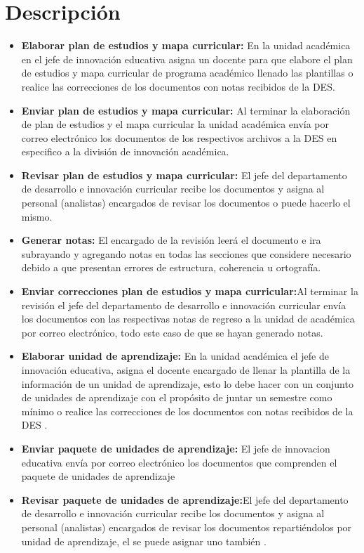 \section{Descripción}
\begin{itemize}
	\item \textbf{Elaborar plan de estudios y mapa curricular:} En la unidad académica en el jefe de innovación educativa asigna un docente para que elabore el plan de estudios y mapa curricular de programa académico llenado las plantillas o realice las correcciones de los documentos con notas recibidos de la DES.  
	\item \textbf{Enviar plan de estudios y mapa curricular:} Al terminar la elaboración de plan de estudios y el mapa curricular la unidad académica envía por correo electrónico los documentos de los respectivos archivos a la DES en especifico a la división de innovación académica.  
	\item \textbf{Revisar plan de estudios y mapa curricular:} El jefe del departamento de desarrollo e innovación curricular recibe los documentos y asigna al personal (analistas) encargados de revisar los documentos o puede hacerlo el mismo. 
	\item \textbf{Generar notas:} El encargado de la revisión leerá el documento e ira subrayando y agregando notas en todas las secciones que considere necesario debido a que presentan errores de estructura, coherencia u ortografía.   
	\item \textbf{Enviar correcciones plan de estudios y mapa curricular:}Al terminar la revisión el jefe del departamento de desarrollo e innovación curricular envía los documentos con las respectivas notas de regreso a la unidad de académica por correo electrónico, todo este caso de que se hayan generado notas. 
	\item \textbf{Elaborar unidad de aprendizaje:} En la unidad académica el jefe de innovación educativa, asigna el docente encargado de llenar la plantilla de la información de un unidad de aprendizaje, esto lo debe hacer con un conjunto de unidades de aprendizaje con el propósito de juntar un semestre como mínimo o realice las correcciones de los documentos con notas recibidos de la DES .     
	\item \textbf{Enviar paquete de  unidades de aprendizaje:} El jefe de innovacion educativa  envía por correo electrónico los documentos que comprenden el paquete de unidades de aprendizaje  
	\item \textbf{Revisar paquete de  unidades de aprendizaje:}El jefe del departamento de desarrollo e innovación curricular recibe los documentos y asigna al personal (analistas) encargados de revisar los documentos repartiéndolos por unidad de aprendizaje, el se puede asignar uno también . 

\end{itemize}
